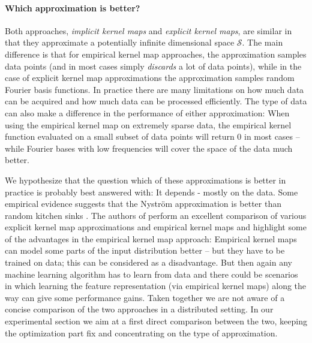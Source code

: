 \documentclass{article} %
\begin{document}
\paragraph{Which approximation is better?}
Both approaches, {\em implicit kernel maps} and {\em explicit kernel maps}, are similar in that they approximate a potentially infinite dimensional space $\mathcal{S}$. The main difference is that for empirical kernel map approaches, the approximation samples data points (and in most cases simply {\em discards} a lot of data points), while in the case of explicit kernel map approximations the approximation samples random Fourier basis functions. In practice there are many limitations on how much data can be acquired and how much data can be processed efficiently. The type of data can also make a difference in the performance of either approximation: When using the empirical kernel map on extremely sparse data, the empirical kernel function evaluated on a small subset of data points will return 0 in most cases -- while Fourier bases with low frequencies will cover the space of the data much better. 

We hypothesize that the question which of these approximations is better in practice is probably best answered with: It depends - mostly on the data. 
Some empirical evidence suggests that the Nystr\"om approximation is better than random kitchen sinks \cite{Yang2012}. The authors of \cite{Vedaldi2010} perform an excellent comparison of various explicit kernel map approximations and empirical kernel maps and highlight some of the advantages in the empirical kernel map approach: Empirical kernel maps can model some parts of the input distribution better -- but they have to be trained on data; this can be considered as a disadvantage. But then again any machine learning algorithm has to learn from data and there could be scenarios in which learning the feature representation (via empirical kernel maps) along the way can give some performance gains. Taken together we are not aware of a concise comparison of the two approaches in a distributed setting. In our experimental section we aim at a first direct comparison between the two, keeping the optimization part fix and concentrating on the type of approximation. 
%
\end{document}
